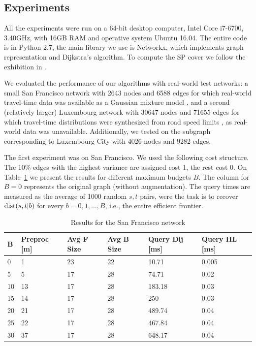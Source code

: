 \subsection{Experiments}

All the experiments were run on a 64-bit desktop computer, Intel Core i7-6700, 3.40GHz,  with 16GB RAM and operative system Ubuntu 16.04.
The entire code is in Python 2.7, the main library we use is Networkx, which implements graph representation and Dijkstra's algorithm.
To compute the SP cover we follow the exhibition in \cite{hubimplem}.

We evaluated the performance of our algorithms with real-world test networks: a small San Francisco network with 2643 nodes and 6588 edges for which real-world travel-time data was available as a Gaussian mixture model \cite{sf_data}, and a second (relatively larger) Luxembourg network with 30647 nodes and 71655 edges for which travel-time distributions were synthesized from road speed limits \cite{niknami2016tractable}, as real-world data was unavailable.
Additionally, we tested on the subgraph corresponding to Luxembourg City with 4026 nodes and 9282 edges.

The first experiment was on San Francisco.
We used the following cost structure.
The 10\% edges with the highest variance are assigned cost 1, the rest cost 0.
On Table~\ref{tab:sf_results} we present the results for different maximum budgets $B$.
The column for $B=0$ represents the original graph (without augmentation).
The query times are measured as the average of 1000 random $s,t$ pairs, were the task is to recover $\text{dist}(s,t|b)$ for every $b=0,1,\ldots,B$, i.e., the entire efficient frontier.

\begin{table}\caption{Results for the San Francisco network}\label{tab:sf_results}
\begin{center}
\begin{tabular}{ | l | p{1cm} | p{1cm} | p{1cm} | p{1.1cm} | p{1.1cm} | }
\hline
	B & Preproc [m] & Avg F Size & Avg B Size & Query Dij [ms] & Query HL [ms] \\ \hline
	0 & 1 & 23 & 22 & 10.71 & 0.005 \\ \hline
	5 & 5 & 17 & 28 & 74.71 & 0.02 \\ \hline
	10 & 13 & 17 & 28 & 183.18 & 0.03 \\ \hline
	15 & 14 & 17 & 28 & 250 & 0.03 \\ \hline
	20 & 21 & 17 & 28 & 489.74 & 0.04 \\ \hline
	25 & 22 & 17 & 28 & 467.84 & 0.04 \\ \hline
	30 & 37 & 17 & 28 & 648.17 & 0.04 \\ \hline
\end{tabular}
\end{center}
\end{table}
 



